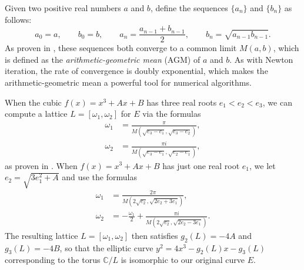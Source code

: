 \documentclass[11pt]{article}
\newcommand{\C}{\mathbb{C}}
\begin{document}
Given two positive real numbers $a$ and $b$, define the sequences $\{a_n\}$ and $\{b_n\}$ as follows:
\begin{equation}\label{eq:agm}
a_0 = a,\qquad b_0 = b,\qquad
a_n = \frac{a_{n-1}+b_{n-1}}{2},\qquad
b_n = \sqrt{a_{n-1}b_{n-1}}.
\end{equation}
As proven in \cite[Prop.\ 9.23]{washington}, these sequences both converge to a common limit $M(a,b)$, which is defined as the \emph{arithmetic-geometric mean} (AGM) of $a$ and $b$.
As with Newton iteration, the rate of convergence is doubly exponential, which makes the arithmetic-geometric mean a powerful tool for numerical algorithms.

When the cubic $f(x)=x^3+Ax+B$ has three real roots $e_1<e_2 < e_3$, we can compute a lattice $L=[\omega_1,\omega_2]$ for $E$ via the formulas
\begin{align*}
\omega_1 &= \frac{\pi }{M(\sqrt{e_3-e_1},\sqrt{e_3-e_2})},\\
\omega_2 &= \frac{\pi i}{M(\sqrt{e_3-e_1},\sqrt{e_2-e_1})},
\end{align*}
as proven in \cite[Thm.\ 9.26]{washington}.
When $f(x)=x^3+Ax+B$ has just one real root $e_1$, we let $e_2=\sqrt{3e_1^2+A}$ and use the formulas
\begin{align*}
\omega_1 &= \frac{2\pi }{M(2\sqrt{e_2},\sqrt{2e_2+3e_1})},\\
\omega_2 &=-\frac{\omega_1}{2}+ \frac{\pi i}{M(2\sqrt{e_2},\sqrt{2e_2-3e_1})}.
\end{align*}
The resulting lattice $L=[\omega_1,\omega_2]$ then satisfies $g_2(L)=-4A$ and $g_3(L)=-4B$, so that the elliptic curve $y^2=4x^3-g_2(L)x-g_3(L)$ corresponding to the torus $\C/L$ is isomorphic to our original curve $E$.
\end{document}
